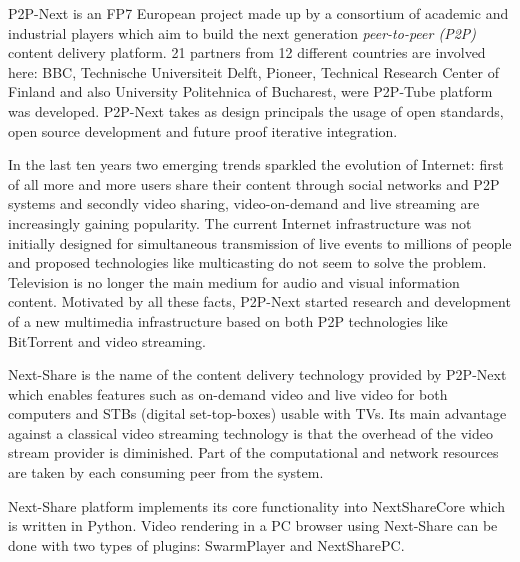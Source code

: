 P2P-Next is an FP7 European project made up by a consortium of academic and industrial players which aim to build the next generation \textit{peer-to-peer (P2P)} content delivery platform. 21 partners from 12 different countries are involved here: BBC, Technische Universiteit Delft, Pioneer, Technical Research Center of Finland and also University Politehnica of Bucharest, were P2P-Tube platform was developed. P2P-Next takes as design principals the usage of open standards, open source development and future proof iterative integration.

In the last ten years two emerging trends sparkled the evolution of Internet: first of all more and more users share their content through social networks and P2P systems and secondly video sharing, video-on-demand and live streaming are increasingly gaining popularity. The current Internet infrastructure was not initially designed for simultaneous transmission of live events to millions of people and proposed technologies like multicasting do not seem to solve the problem. Television is no longer the main medium for audio and visual information content. Motivated by all these facts, P2P-Next started research and development of a new multimedia infrastructure based on both P2P technologies like BitTorrent and video streaming.

Next-Share is the name of the content delivery technology provided by P2P-Next which enables features such as on-demand video and live video for both computers and STBs (digital set-top-boxes) usable with TVs. Its main advantage against a classical video streaming technology is that the overhead of the video stream provider is diminished. Part of the computational and network resources are taken by each consuming peer from the system.

Next-Share platform implements its core functionality into NextShareCore which is written in Python. Video rendering in a PC browser using Next-Share can be done with two types of plugins: SwarmPlayer and NextSharePC.

